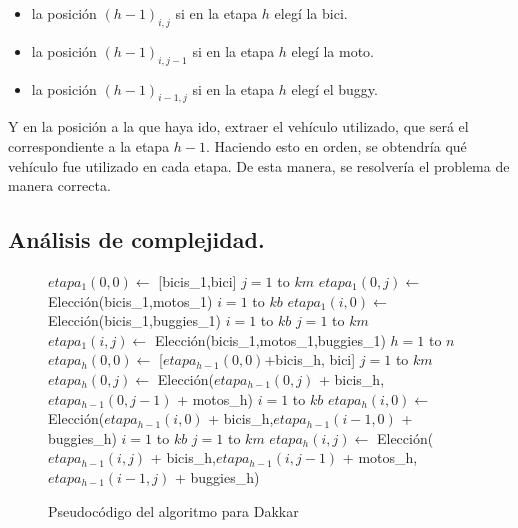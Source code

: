 \begin{itemize}
	\item la posición $(h-1)_{i,j}$ si en la etapa $h$ elegí la bici.
	\item la posición $(h-1)_{i,j-1}$ si en la etapa $h$ elegí la moto.
	\item la posición $(h-1)_{i-1,j}$ si en la etapa $h$ elegí el buggy.
\end{itemize}			

	 Y en la posición a la que haya ido, extraer el vehículo utilizado, que será el correspondiente a la etapa $h-1$. Haciendo esto en orden, se obtendría qué vehículo fue utilizado en cada etapa. De esta manera, se resolvería el problema de manera correcta.
 
\vspace*{0.6cm}


\subsection{Análisis de complejidad.}

\vspace*{0.3cm}

\begin{figure}[!ht]
\begin{codebox}
\li $etapa_1(0,0) \leftarrow$ [bicis_1,bici]
\li \For $j = 1$ to $km$
\li 		\Do $etapa_1(0,j) \leftarrow$ {\sc Elección}(bicis_1,motos_1)
		\End
\li \For $i = 1$ to $kb$
\li 		\Do $etapa_1(i,0) \leftarrow$ {\sc Elección}(bicis_1,buggies_1)
		\End		
\li \For $i = 1$ to $kb$
\li 		\Do 
		\For $j = 1$ to $km$
\li			\Do $etapa_1(i,j) \leftarrow$ {\sc Elección}(bicis_1,motos_1,buggies_1)
			\End
		\End
\li \For $h = 1$ to $n$
\li 		\Do 
			$etapa_h(0,0) \leftarrow$ [$etapa_{h-1}(0,0)$+bicis_h, bici]
\li 			\For $j = 1$ to $km$
\li 				\Do $etapa_h(0,j) \leftarrow$ {\sc Elección}($etapa_{h-1}(0,j)$ + bicis_h,$etapa_{h-1}(0,j-1)$ + motos_h)
				\End
\li 			\For $i = 1$ to $kb$
\li 				\Do $etapa_h(i,0) \leftarrow$ {\sc Elección}($etapa_{h-1}(i,0)$ + bicis_h,$etapa_{h-1}(i-1,0)$ + buggies_h)
				\End
\li 			\For $i = 1$ to $kb$
\li 				\Do
				\For $j = 1$ to $km$
\li	 				\Do $etapa_h(i,j) \leftarrow$ {\sc Elección}($etapa_{h-1}(i,j)$ + bicis_h,$etapa_{h-1}(i,j-1)$ + motos_h,\\ \hspace*{10cm} $etapa_{h-1}(i-1,j)$ + buggies_h)
					\End
				\End
		\End
\end{codebox} 
\caption{Pseudocódigo del algoritmo para Dakkar}\label{code:dakkar}
\end{figure}

